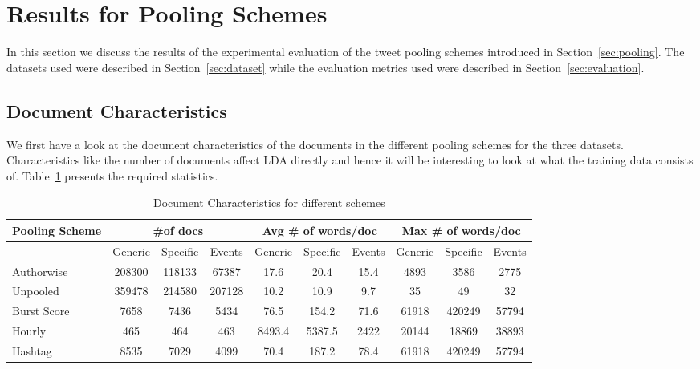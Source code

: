 \documentclass{sig-alternate}
\begin{document}
\section{Results for Pooling Schemes}

In this section we discuss the results of the experimental evaluation
of the tweet pooling schemes introduced in
Section~\ref{sec:pooling}. The datasets used were described in
Section~\ref{sec:dataset} while the evaluation metrics used were
described in Section~\ref{sec:evaluation}.

\label{sec:init_results}

\subsection{Document Characteristics}

We first have a look at the document characteristics of the documents in the
different pooling schemes for the three datasets. Characteristics
like the number of documents affect LDA directly and hence it will be
interesting to look at what the training data consists
of. Table~\ref{tbl-3} presents the required statistics.

{
\begin{table}%
\centering
\caption{Document Characteristics for different schemes}\label{tbl-3}
\resizebox{14cm}{!} 
{
	\begin{tabular}{|l|ccc|ccc|ccc|}
	\hline
	Pooling Scheme  & \multicolumn {3}{c|}{\#of docs} & \multicolumn {3}{c|}{Avg \# of words/doc} & \multicolumn {3}{c|}{Max \# of words/doc}\\
	\hline
	 & Generic & Specific & Events &  Generic & Specific & Events &  Generic & Specific & Events\\
	\hline
	Authorwise & 208300 & 118133 & 67387 & 17.6 & 20.4 & 15.4 & 4893 & 3586 & 2775 \\
	\hline
	Unpooled & 359478 & 214580 & 207128 & 10.2 & 10.9 & 9.7 & 35 & 49 & 32 \\
	\hline
	Burst Score & 7658 & 7436 & 5434 & 76.5 & 154.2 & 71.6 & 61918 & 420249 & 57794 \\
	\hline
	Hourly & 465 & 464 & 463 & 8493.4 & 5387.5 & 2422 & 20144 & 18869 & 38893 \\
	\hline
	Hashtag & 8535 & 7029 & 4099 & 70.4 & 187.2 & 78.4 & 61918 & 420249 & 57794 \\
	\hline
	\end{tabular}
}\vspace*{-6pt}
\end{table}
}
\end{document}
